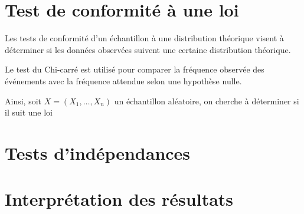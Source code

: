 
\section{Test de conformité à une loi}

Les tests de conformité d'un échantillon à une distribution théorique visent à 
déterminer si les données observées suivent une certaine distribution théorique.

Le test du Chi-carré est utilisé pour comparer la fréquence observée des événements avec la fréquence 
attendue selon une hypothèse nulle.

Ainsi, soit $X = (X_1, \dots, X_n)$ un échantillon aléatoire, on cherche à déterminer si il suit une loi 



\section{Tests d'indépendances}





\section{Interprétation des résultats}

